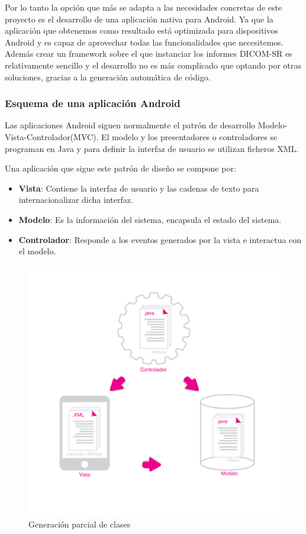 Por lo tanto la opción que más se adapta a las necesidades concretas de este proyecto es el desarrollo de una aplicación nativa para Android. Ya que la aplicación que obtenemos como resultado está optimizada para dispositivos Android y es capaz de aprovechar todas las funcionalidades que necesitemos. Además crear un framework sobre el que instanciar los informes DICOM-SR es relativamente sencillo y el desarrollo no es más complicado que optando por otras soluciones, gracias a la generación automática de código. \par

\subsubsection{Esquema de una aplicación Android}
Las aplicaciones Android siguen normalmente el patrón de desarrollo Modelo-Vista-Controlador(MVC).
El modelo y los presentadores o controladores se programan en Java y para definir la interfaz de usuario se utilizan ficheros XML.\par
Una aplicación que sigue este patrón de diseño se compone por:
\begin{itemize}
\item \textbf{Vista}: Contiene la interfaz de usuario y las cadenas de texto para internacionalizar dicha interfaz.\par
\item \textbf{Modelo}: Es la información del sistema, encapsula el estado del sistema. 
\item \textbf{Controlador}: Responde a los eventos generados por la vista e interactua con el modelo. 
\end{itemize}

\begin{figure}[ht]
\centering
\includegraphics[scale=0.5]{./imgs/esquemas/mvc.pdf}
\caption{Generación parcial de clases}
\label{fig:mvc}
\end{figure}

